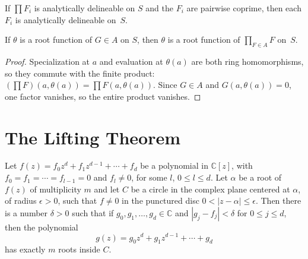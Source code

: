 \begin{lemma}
  \label{lem:delineable_factor_of_delineable_prod}
  \leanok
  If $\prod F_i$ is analytically delineable on $S$ and the $F_i$ are pairwise
  coprime, then each $F_i$ is analytically delineable on~$S$.
\end{lemma}

\begin{lemma}
  \label{lem:root_function_factor_of_prod}
  \leanok
  If $\theta$ is a root function of $G \in A$ on $S$, then $\theta$ is a root
  function of $\prod_{F \in A} F$ on~$S$.
\end{lemma}
\begin{proof}
  \leanok
  Specialization at $a$ and evaluation at $\theta(a)$ are both ring
  homomorphisms, so they commute with the finite product:
  $(\prod F)(a, \theta(a)) = \prod F(a, \theta(a))$.  Since $G \in A$ and
  $G(a, \theta(a)) = 0$, one factor vanishes, so the entire product vanishes.
\end{proof}

\section{The Lifting Theorem}

\begin{theorem}
    \label{thm:root_cont_princ}

Let $f(z) = f_0 z^d + f_1 z^{d-1} + \cdots + f_d$ be a polynomial in
    $\mathbb{C}[z]$, with $f_0 = f_1 = \cdots = f_{l-1} = 0$ and $f_l \ne 0$, for
some $l$, $0 \le l \le d$. Let $\alpha$ be a root of $f(z)$ of
multiplicity $m$ and let $C$ be a circle in the complex plane centered
at $\alpha$, of radius $\epsilon > 0$, such that $f \ne 0$ in the
punctured disc $0 < |z - \alpha| \le \epsilon$. Then there is a number
    $\delta > 0$ such that if $g_0, g_1, \ldots, g_d \in \mathbb{C}$ and
$|g_j - f_j| < \delta$ for $0 \le j \le d$, then the polynomial
\begin{equation}
g(z) = g_0 z^d + g_1 z^{d-1} + \cdots + g_d
\end{equation}
has exactly $m$ roots inside $C$.

\end{theorem}

